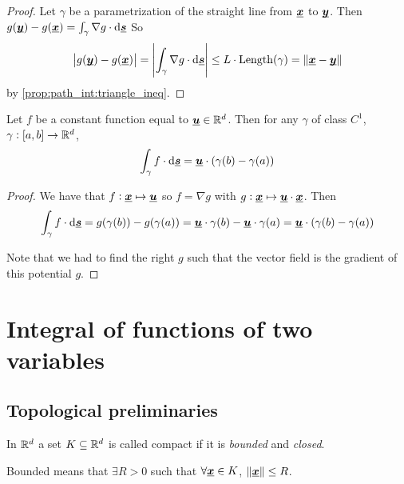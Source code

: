 \documentclass[12pt]{extarticle}
\renewcommand{\vec}[1]{\uvec{#1}}
\begin{document}
\begin{proof}
    Let $\gamma$ be a parametrization of the straight line from $\vec x$ to $\vec y$.
    Then $g(\vec y) - g(\vec x) = \int_\gamma \nabla g \cdot \dd{\vec s}$
    So
    \begin{equation}
        \abs{g(\vec y) - g(\vec x)} = \abs{\int_\gamma \nabla g \cdot \dd{\vec s}} \leq L \cdot {\operatorfont Length}(\gamma) = \norm{\vec x - \vec y}
    \end{equation}
    by \autoref{prop:path_int:triangle_ineq}.
\end{proof}

\begin{lemma}
    Let $f$ be a constant function equal to $\vec u \in \R^d$.
    Then for any $\gamma$ of class $C^1$, $\gamma: [a, b] \to \mathbb{R}^d$,
    \begin{equation}
        \int_\gamma f \cdot \dd{\vec s} = \vec u \cdot (\gamma(b) - \gamma(a))
    \end{equation}
\end{lemma}
\begin{proof}
    We have that $f: \vec x \mapsto \vec u$ so $f = \nabla g$ with $g: \vec x \mapsto \vec u \cdot \vec x$.
    Then
    \begin{equation}
        \int_\gamma f \cdot \dd{\vec s} = g(\gamma(b)) - g(\gamma(a)) = \vec u \cdot \gamma(b) - \vec u \cdot \gamma(a) = \vec u \cdot (\gamma(b) - \gamma(a))
    \end{equation}

    Note that we had to find the right $g$ such that the vector field is the gradient of this potential $g$.
\end{proof}

\section{Integral of functions of two variables}

\subsection{Topological preliminaries}

\begin{definition}
    In $\mathbb{R}^d$ a set $K \subseteq \mathbb{R}^d$ is called compact if it is \emph{bounded} and \emph{closed}.
\end{definition}
\begin{remark}
    Bounded means that $\exists R > 0$ such that $\forall \vec x \in K$, $\norm{\vec x} \leq R$.
\end{remark}
\end{document}
